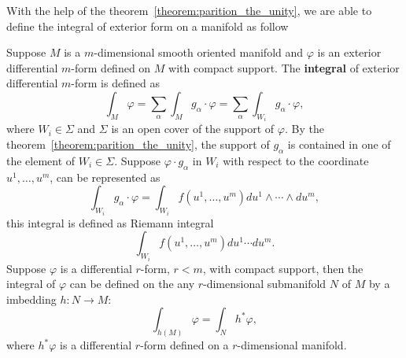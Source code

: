 With the help of the theorem~\ref{theorem:parition_the_unity}, we are able to define the integral of exterior form on a manifold as follow
\begin{definition}
Suppose $M$ is a $m$-dimensional smooth oriented manifold and $\varphi$ is an exterior differential $m$-form defined on $M$ with compact support. The \textbf{integral} of exterior differential $m$-form is defined as
\begin{equation}
\int_M\varphi=\sum_\alpha\int_{M}g_\alpha\cdot\varphi=\sum_\alpha\int_{W_i}g_\alpha\cdot\varphi,
\end{equation} 
where $W_i\in\Sigma$ and $\Sigma$ is an open cover of the support of $\varphi$. By the theorem~\ref{theorem:parition_the_unity}, the support of $g_\alpha$ is contained in one of the element of $W_i\in\Sigma$. Suppose $\varphi\cdot g_\alpha$ in $W_i$ with respect to the coordinate $u^1,\dots, u^m$, can be represented as
\begin{equation}
\int_{W_i}g_\alpha\cdot\varphi=\int_{W_i}f(u^1,\dots,u^m)du^1\wedge\cdots\wedge du^m,
\end{equation}
this integral is defined as Riemann integral
\begin{equation}
\int_{W_i}f(u^1,\dots,u^m)du^1\cdots du^m.
\end{equation}
Suppose $\varphi$ is a differential $r$-form, $r<m$, with compact support, then the integral of $\varphi$ can be defined on the any $r$-dimensional submanifold $N$ of $M$ by a imbedding $h:N\to M$:
\begin{equation}
\int_{h(M)}\varphi = \int_N h^*\varphi,
\end{equation}
where $h^*\varphi$ is a differential $r$-form defined on a $r$-dimensional manifold.
\end{definition}\label{definition:exterior_form_integral}

